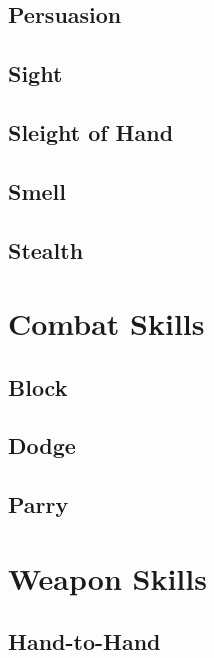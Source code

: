 \subsection{Persuasion}\label{skill:persuasion}

\subsection{Sight}\label{skill:sight}

\subsection{Sleight of Hand}\label{skill:sleight-of-hand}

\subsection{Smell}\label{skill:smell}

\subsection{Stealth}\label{skill:stealth}

\section{Combat Skills}

\subsection{Block}\label{skill:block}

\subsection{Dodge}\label{skill:dodge}

\subsection{Parry}\label{skill:parry}

\section{Weapon Skills}

\subsection{Hand-to-Hand}\label{skill:hand-to-hand}

